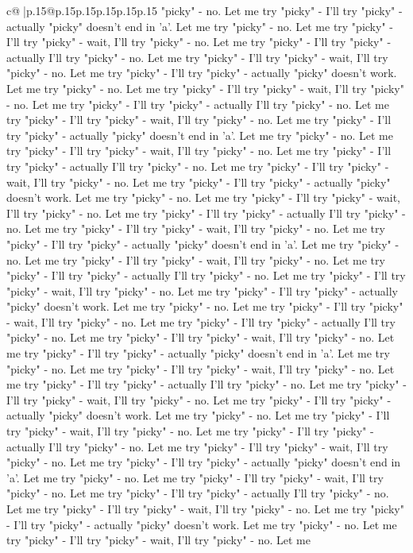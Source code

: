 \documentclass{article}
\begin{document}
{\begin{supertabular}{c@{$\;$}|p{.15\linewidth}@{}p{.15\linewidth}p{.15\linewidth}p{.15\linewidth}p{.15\linewidth}p{.15\linewidth}}
{{{"picky" {-} no. Let me try "picky" {-} I'll try "picky" {-} actually "picky" doesn't end in 'a'. Let me try "picky" {-} no. Let me try "picky" {-} I'll try "picky" {-} wait, I'll try "picky" {-} no. Let me try "picky" {-} I'll try "picky" {-} actually I'll try "picky" {-} no. Let me try "picky" {-} I'll try "picky" {-} wait, I'll try "picky" {-} no. Let me try "picky" {-} I'll try "picky" {-} actually "picky" doesn't work. Let me try "picky" {-} no. Let me try "picky" {-} I'll try "picky" {-} wait, I'll try "picky" {-} no. Let me try "picky" {-} I'll try "picky" {-} actually I'll try "picky" {-} no. Let me try "picky" {-} I'll try "picky" {-} wait, I'll try "picky" {-} no. Let me try "picky" {-} I'll try "picky" {-} actually "picky" doesn't end in 'a'. Let me try "picky" {-} no. Let me try "picky" {-} I'll try "picky" {-} wait, I'll try "picky" {-} no. Let me try "picky" {-} I'll try "picky" {-} actually I'll try "picky" {-} no. Let me try "picky" {-} I'll try "picky" {-} wait, I'll try "picky" {-} no. Let me try "picky" {-} I'll try "picky" {-} actually "picky" doesn't work. Let me try "picky" {-} no. Let me try "picky" {-} I'll try "picky" {-} wait, I'll try "picky" {-} no. Let me try "picky" {-} I'll try "picky" {-} actually I'll try "picky" {-} no. Let me try "picky" {-} I'll try "picky" {-} wait, I'll try "picky" {-} no. Let me try "picky" {-} I'll try "picky" {-} actually "picky" doesn't end in 'a'. Let me try "picky" {-} no. Let me try "picky" {-} I'll try "picky" {-} wait, I'll try "picky" {-} no. Let me try "picky" {-} I'll try "picky" {-} actually I'll try "picky" {-} no. Let me try "picky" {-} I'll try "picky" {-} wait, I'll try "picky" {-} no. Let me try "picky" {-} I'll try "picky" {-} actually "picky" doesn't work. Let me try "picky" {-} no. Let me try "picky" {-} I'll try "picky" {-} wait, I'll try "picky" {-} no. Let me try "picky" {-} I'll try "picky" {-} actually I'll try "picky" {-} no. Let me try "picky" {-} I'll try "picky" {-} wait, I'll try "picky" {-} no. Let me try "picky" {-} I'll try "picky" {-} actually "picky" doesn't end in 'a'. Let me try "picky" {-} no. Let me try "picky" {-} I'll try "picky" {-} wait, I'll try "picky" {-} no. Let me try "picky" {-} I'll try "picky" {-} actually I'll try "picky" {-} no. Let me try "picky" {-} I'll try "picky" {-} wait, I'll try "picky" {-} no. Let me try "picky" {-} I'll try "picky" {-} actually "picky" doesn't work. Let me try "picky" {-} no. Let me try "picky" {-} I'll try "picky" {-} wait, I'll try "picky" {-} no. Let me try "picky" {-} I'll try "picky" {-} actually I'll try "picky" {-} no. Let me try "picky" {-} I'll try "picky" {-} wait, I'll try "picky" {-} no. Let me try "picky" {-} I'll try "picky" {-} actually "picky" doesn't end in 'a'. Let me try "picky" {-} no. Let me try "picky" {-} I'll try "picky" {-} wait, I'll try "picky" {-} no. Let me try "picky" {-} I'll try "picky" {-} actually I'll try "picky" {-} no. Let me try "picky" {-} I'll try "picky" {-} wait, I'll try "picky" {-} no. Let me try "picky" {-} I'll try "picky" {-} actually "picky" doesn't work. Let me try "picky" {-} no. Let me try "picky" {-} I'll try "picky" {-} wait, I'll try "picky" {-} no. Let me }}}
\end{supertabular}}
\end{document}
